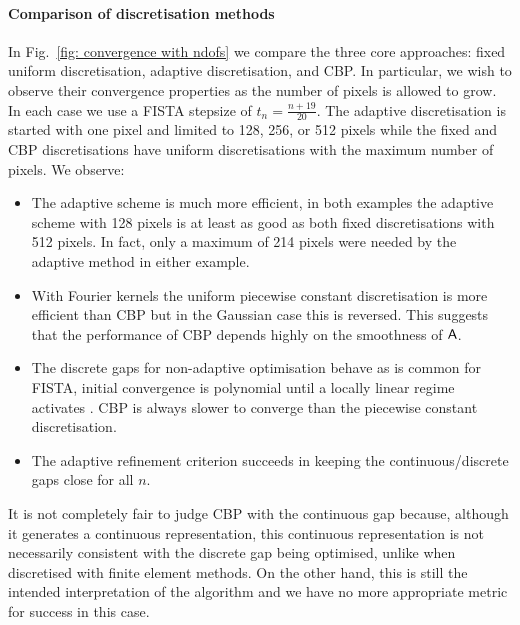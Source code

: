 \documentclass[smallextended]{svjour3}
\newcommand{\1}{\F{1}}
\begin{document}
	\paragraph{Comparison of discretisation methods}
	In Fig.~\ref{fig: convergence with ndofs} we compare the three core approaches: fixed uniform
	discretisation, adaptive discretisation, and CBP. In particular, we wish to observe their convergence properties as the number of pixels is allowed to grow. In each case we use a FISTA stepsize of $t_n = \frac{n+19}{20}$. The adaptive discretisation is started with one pixel and limited to 128, 256, or 512 pixels while the fixed and CBP discretisations have uniform discretisations with the maximum number of pixels. We observe:
	\begin{itemize}
		\item The adaptive scheme is much more efficient, in both examples the adaptive scheme with 128 pixels is at least as good as both fixed discretisations with 512 pixels. In fact, only a maximum of 214 pixels were needed by the adaptive method in either example.
		\item With Fourier kernels the uniform piecewise constant discretisation is more efficient than CBP but in the Gaussian case this is reversed. This suggests that the performance of CBP depends highly on the smoothness of $\mathsf{A}$.
		\item The discrete gaps for non-adaptive optimisation behave as is common for FISTA, initial convergence is polynomial until a locally linear regime activates \cite{Tao2016}. CBP is always slower to converge than the piecewise constant discretisation.
		\item The adaptive refinement criterion succeeds in keeping the continuous/discrete gaps close for all $n$.
	\end{itemize}
	It is not completely fair to judge CBP with the continuous gap because, although it generates a continuous representation, this continuous representation is not necessarily consistent with the discrete gap being optimised, unlike when discretised with finite element methods. On the other hand, this is still the intended interpretation of the algorithm and we have no more appropriate metric for success in this case.
	
\end{document}
